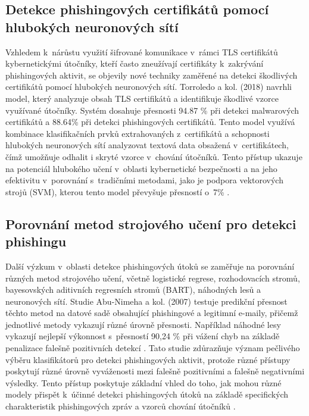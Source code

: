 \subsection{Detekce phishingových certifikátů pomocí hlubokých neuronových sítí}
Vzhledem k~nárůstu využití šifrované komunikace v~rámci TLS certifikátů kybernetickými útočníky, kteří často zneužívají certifikáty k~zakrývání phishingových aktivit, se objevily nové techniky zaměřené na detekci škodlivých certifikátů pomocí hlubokých neuronových sítí. Torroledo a kol. (2018) navrhli model, který analyzuje obsah TLS certifikátů a identifikuje škodlivé vzorce využívané útočníky. Systém dosahuje přesnosti 94.87 \%  při detekci malwarových certifikátů a 88.64\% při detekci phishingových certifikátů. Tento model využívá kombinace klasifikačních prvků extrahovaných z~certifikátů a schopnosti hlubokých neuronových sítí analyzovat textová data obsažená v~certifikátech, čímž umožňuje odhalit i skryté vzorce v~chování útočníků. Tento přístup ukazuje na potenciál hlubokého učení v~oblasti kybernetické bezpečnosti a na jeho efektivitu v~porovnání s~tradičními metodami, jako je podpora vektorových strojů (SVM), kterou tento model převyšuje přesností o~7\% \cite{torroledo2018hunting}.

\subsection{Porovnání metod strojového učení pro detekci phishingu}
Další výzkum v~oblasti detekce phishingových útoků se zaměřuje na porovnání různých metod strojového učení, včetně logistické regrese, rozhodovacích stromů, bayesovských aditivních regresních stromů (BART), náhodných lesů a neuronových sítí. Studie Abu-Nimeha a kol. (2007) testuje predikční přesnost těchto metod na datové sadě obsahující phishingové a legitimní e-maily, přičemž jednotlivé metody vykazují různé úrovně přesnosti. Například náhodné lesy vykazují nejlepší výkonnost s~přesností 90,24 \% při vážení chyb na základě penalizace falešně pozitivních detekcí \cite{abuNimeh2007comparison}. Tato studie zdůrazňuje význam pečlivého výběru klasifikátorů pro detekci phishingových aktivit, protože různé přístupy poskytují různé úrovně vyváženosti mezi falešně pozitivními a falešně negativními výsledky. Tento přístup poskytuje základní vhled do toho, jak mohou různé modely přispět k~účinné detekci phishingových útoků na základě specifických charakteristik phishingových zpráv a vzorců chování útočníků \cite{abuNimeh2007comparison}.

